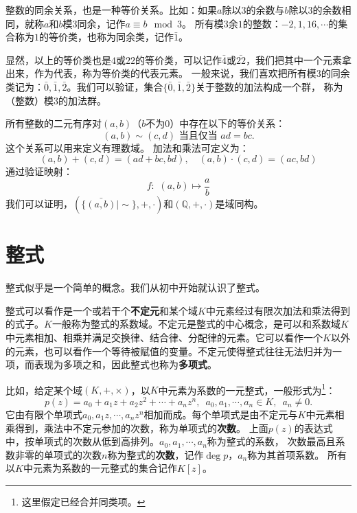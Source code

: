 \documentclass[12pt,UTF8]{ctexbook}
\begin{document}
\begin{appendix}
整数的同余关系，也是一种等价关系。比如：如果$a$除以$3$的余数与$b$除以$3$的余数相同，就称$a$和$b$模$3$同余，记作$a \equiv b \mod{3}$。
所有模$3$余$1$的整数：$-2, 1, 16, \cdots$的集合称为$1$的等价类，也称为同余类，记作$\bar{1}$。

显然，以上的等价类也是$4$或$22$的等价类，可以记作$\bar{4}$或$\bar{22}$，我们把其中一个元素拿出来，作为代表，称为等价类的代表元素。
一般来说，我们喜欢把所有模$3$的同余类记为：$\bar{0}, \bar{1}, \bar{2}$。我们可以验证，集合$\{\bar{0}, \bar{1}, \bar{2}\}$关于整数的加法构成一个群，
称为（整数）模$3$的加法群。

所有整数的二元有序对$(a, b)$（$b$不为$0$）中存在以下的等价关系：
$$(a, b) \sim (c, d) \mbox{ 当且仅当 } ad = bc.$$
这个关系可以用来定义有理数域。
加法和乘法可定义为：
$$ (a, b) + (c, d) = (ad + bc, bd), \quad (a, b) \cdot (c, d) = (ac, bd)$$
通过验证映射：
$$ f: \,\, (a, b) \mapsto \frac{a}{b}$$
我们可以证明，$\left(\{\bar{(a, b)} | \sim\}, +, \cdot\right)$和$\left(\mathbb{Q}, +, \cdot\right)$是域同构。



\section{整式}
整式似乎是一个简单的概念。我们从初中开始就认识了整式。

整式可以看作是一个或若干个\textbf{不定元}和某个域$K$中元素经过有限次加法和乘法得到的式子。$K$一般称为整式的系数域。不定元是整式的中心概念，是可以和系数域$K$中元素相加、相乘并满足交换律、结合律、分配律的元素。它可以看作一个$K$以外的元素，也可以看作一个等待被赋值的变量。不定元使得整式往往无法归并为一项，而表现为多项之和，因此整式也称为\textbf{多项式}。

比如，给定某个域$(K, +, \times )$，以$K$中元素为系数的一元整式，一般形式为\footnote{这里假定已经合并同类项。}：
$$ p(z) = a_0 + a_1 z + a_2 z^2 + \cdots + a_n z^n, \,\,\, a_0, a_1, \cdots ,a_n \in K, \,\,\, a_n \neq 0.$$
它由有限个单项式$a_0, a_1 z, \cdots, a_n z^n$相加而成。每个单项式是由不定元与$K$中元素相乘得到，乘法中不定元参加的次数，称为单项式的\textbf{次数}。
上面$p(z)$的表达式中，按单项式的次数从低到高排列。$a_0, a_1, \cdots , a_n$称为整式的系数，
次数最高且系数非零的单项式的次数$n$称为整式的\textbf{次数}，记作$\deg{p}$，$a_n$称为其首项系数。
所有以$K$中元素为系数的一元整式的集合记作$K[z]$。


\end{appendix}
\end{document}
